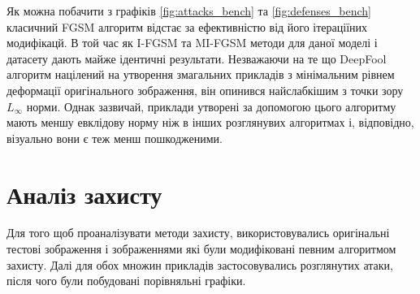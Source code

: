 \documentclass[a4paper,14pt]{extreport}
\begin{document}
	Як можна побачити з графіків \ref{fig:attacks_bench} та \ref{fig:defenses_bench} класичний FGSM алгоритм відстає за ефективністю від його ітераціїних модифікацй. В той час як I-FGSM та MI-FGSM методи для даної моделі і датасету дають майже ідентичні результати. Незважаючи на те що DeepFool алгоритм націлений на утворення змагальних прикладів з мінімальним рівнем деформації оригінального зображення, він опинився найслабкішим з точки зору $L_{\infty}$ норми. Однак зазвичай, приклади утворені за допомогою цього алгоритму мають меншу евклідову норму ніж в інших розглянувих алгоритмах і, відповідно, візуально вони є теж менш пошкодженими. 
	
	\section{Аналіз захисту}
	Для того щоб проаналізувати методи захисту, використовувались оригінальні тестові зображення і зображеннями які були модифіковані певним алгоритмом захисту. Далі для обох множин прикладів застосовувались розглянутих атаки, після чого були побудовані порівняльні графіки.
\end{document}
